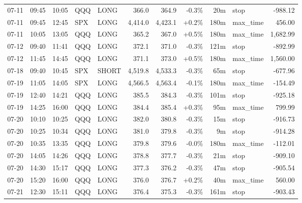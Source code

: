 \documentclass[11pt,a4paper,twoside]{article}
\begin{document}
\begin{center}
\begin{longtable}{>{\color{txtmain}}l l l l l r r r r >{\color{txtmain}}l r}
07-11 & 09:45 & 10:05 & QQQ & LONG & 366.0 & 364.9 & \textcolor{lossred}{-0.3\%} & 20m & stop & \textcolor{lossred}{-988.12} \\
07-11 & 09:45 & 12:45 & SPX & LONG & 4,414.0 & 4,423.1 & \textcolor{wingreen}{+0.2\%} & 180m & max\_time & \textcolor{wingreen}{456.00} \\
07-11 & 10:05 & 13:05 & QQQ & LONG & 365.2 & 367.0 & \textcolor{wingreen}{+0.5\%} & 180m & max\_time & \textcolor{wingreen}{1,682.99} \\
07-12 & 09:40 & 11:41 & QQQ & LONG & 372.1 & 371.0 & \textcolor{lossred}{-0.3\%} & 121m & stop & \textcolor{lossred}{-892.99} \\
07-12 & 11:45 & 14:45 & QQQ & LONG & 371.1 & 373.0 & \textcolor{wingreen}{+0.5\%} & 180m & max\_time & \textcolor{wingreen}{1,560.00} \\
07-18 & 09:40 & 10:45 & SPX & SHORT & 4,519.8 & 4,533.3 & \textcolor{lossred}{-0.3\%} & 65m & stop & \textcolor{lossred}{-677.96} \\
07-19 & 11:05 & 14:05 & SPX & LONG & 4,566.5 & 4,563.4 & \textcolor{lossred}{-0.1\%} & 180m & max\_time & \textcolor{lossred}{-154.49} \\
07-19 & 12:40 & 14:21 & QQQ & LONG & 385.5 & 384.3 & \textcolor{lossred}{-0.3\%} & 101m & stop & \textcolor{lossred}{-925.18} \\
07-19 & 14:25 & 16:00 & QQQ & LONG & 384.4 & 385.4 & \textcolor{wingreen}{+0.3\%} & 95m & max\_time & \textcolor{wingreen}{799.99} \\
07-20 & 10:10 & 10:25 & QQQ & LONG & 382.0 & 380.8 & \textcolor{lossred}{-0.3\%} & 15m & stop & \textcolor{lossred}{-916.73} \\
07-20 & 10:25 & 10:34 & QQQ & LONG & 381.0 & 379.8 & \textcolor{lossred}{-0.3\%} & 9m & stop & \textcolor{lossred}{-914.28} \\
07-20 & 10:35 & 13:35 & QQQ & LONG & 379.8 & 379.6 & \textcolor{lossred}{-0.0\%} & 180m & max\_time & \textcolor{lossred}{-112.01} \\
07-20 & 14:05 & 14:26 & QQQ & LONG & 378.8 & 377.7 & \textcolor{lossred}{-0.3\%} & 21m & stop & \textcolor{lossred}{-909.10} \\
07-20 & 14:30 & 15:17 & QQQ & LONG & 377.3 & 376.2 & \textcolor{lossred}{-0.3\%} & 47m & stop & \textcolor{lossred}{-905.54} \\
07-20 & 15:20 & 16:00 & QQQ & LONG & 376.0 & 376.7 & \textcolor{wingreen}{+0.2\%} & 40m & max\_time & \textcolor{wingreen}{560.00} \\
07-21 & 12:30 & 15:11 & QQQ & LONG & 376.4 & 375.3 & \textcolor{lossred}{-0.3\%} & 161m & stop & \textcolor{lossred}{-903.43} \\

\end{longtable}
\end{center}
\end{document}
